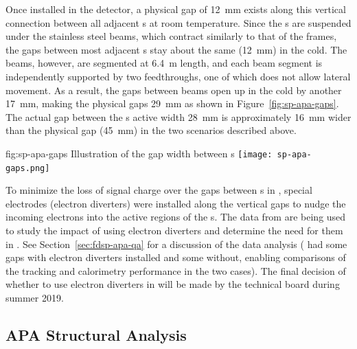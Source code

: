 Once installed in the detector, a physical gap of \SI{12}{mm} exists along this vertical connection between all adjacent s at room temperature. Since the s are suspended under the stainless steel  beams, which contract similarly to that of the  frames, the gaps between most adjacent s stay about the same (\SI{12}{mm}) in the cold.  The  beams, however, are segmented at \SI{6.4}{m} length, and each beam segment is independently supported by two  feedthroughs, one of which does not allow lateral movement.  As a result, the gaps between  beams open up in the cold by another \SI{17}{mm},  %
making the physical gaps \SI{29}{mm} as shown in Figure~\ref{fig:sp-apa-gaps}.  The actual gap between the s active width \SI{28}{mm} is approximately \SI{16}{mm} wider than the physical gap (\SI{45}{mm}) in the two scenarios described above.

\begin{dunefigure}{fig:sp-apa-gaps}
{Illustration of the gap width between s}  
\texttt{[image: sp-apa-gaps.png]} 
\end{dunefigure}

 
To minimize the loss of signal charge over the gaps between s in , special electrodes (electron diverters) were installed along the vertical gaps to nudge the incoming electrons into the active regions of the s. The data from  are being used to study the impact of using electron diverters and determine the need for them in .  See Section~\ref{sec:fdsp-apa-qa} for a discussion of the  data analysis ( had some gaps with electron diverters installed and some without, enabling comparisons of the tracking and calorimetry performance in the two cases).  The final decision of whether to use electron diverters in  will be made by the  technical board during summer 2019.    




\subsection{APA Structural Analysis}


